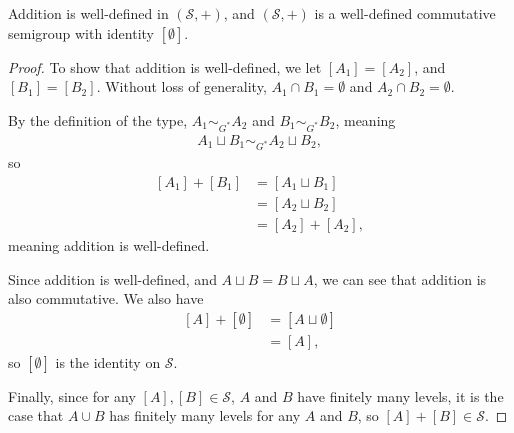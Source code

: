 \begin{fact}
  Addition is well-defined in $\left(\mathcal{S},+\right)$, and $\left(\mathcal{S},+\right)$ is a well-defined commutative semigroup with identity $\left[\emptyset\right]$.\label{fact:type_semigroup_well_defined}
\end{fact}
\begin{proof}
  To show that addition is well-defined, we let $\left[A_1\right] = \left[A_2\right]$, and $\left[B_1\right] = \left[B_2\right]$. Without loss of generality, $A_1\cap B_1 = \emptyset$ and $A_2\cap B_2 = \emptyset$.\newline

  By the definition of the type, $A_1\sim_{G^{\ast}}A_2$ and $B_1\sim_{G^{\ast}}B_2$, meaning
  \begin{align*}
    A_1\sqcup B_1\sim_{G^{\ast}} A_2\sqcup B_2,
  \end{align*}
  so
  \begin{align*}
    \left[A_1\right] + \left[B_1\right] &= \left[A_1\sqcup B_1\right]\\
                                        &= \left[A_2\sqcup B_2\right]\\
                                        &= \left[A_2\right] + \left[A_2\right],
  \end{align*}
  meaning addition is well-defined.\newline

  Since addition is well-defined, and $A\sqcup B = B\sqcup A$, we can see that addition is also commutative. We also have
  \begin{align*}
    \left[A\right] + \left[\emptyset\right] &= \left[A\sqcup \emptyset\right]\\
                                            &= \left[A\right],
  \end{align*}
  so $\left[\emptyset\right]$ is the identity on $\mathcal{S}$.\newline

  Finally, since for any $\left[A\right],\left[B\right]\in \mathcal{S}$, $A$ and $B$ have finitely many levels, it is the case that $A\cup B$ has finitely many levels for any $A$ and $B$, so $\left[A\right] + \left[B\right] \in \mathcal{S}$. 
\end{proof}

